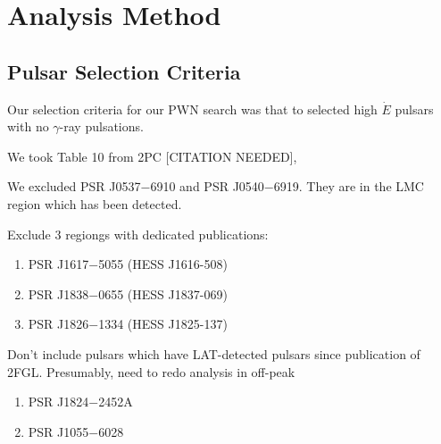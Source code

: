 \section{Analysis Method}

\subsection{Pulsar Selection Criteria}

Our selection criteria for our PWN search was that to selected high $\dot E$
pulsars with no $\gamma$-ray pulsations.

We took Table 10 from 2PC [CITATION NEEDED],

We excluded PSR J0537$-$6910 and PSR J0540$-$6919. They are in the LMC region which has been detected.

Exclude 3 regiongs with dedicated publications:
\begin{enumerate}
  \item PSR J1617$-$5055 (HESS J1616-508)
  \item PSR J1838$-$0655 (HESS J1837-069)
  \item PSR J1826$-$1334 (HESS J1825-137)
\end{enumerate}

Don't include pulsars which have LAT-detected pulsars since publication of 2FGL.
Presumably, need to redo analysis in off-peak
\begin{enumerate}
  \item PSR J1824$-$2452A 
  \item PSR J1055$-$6028
\end{enumerate}

